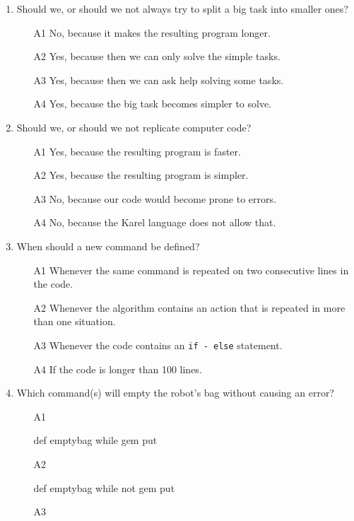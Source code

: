 \begin{enumerate}
\item Should we, or should we not always try to split a big task into smaller ones?
\begin{enumerate}
\item[A1] No, because it makes the resulting program longer.
\item[A2] Yes, because then we can only solve the simple tasks.
\item[A3] Yes, because then we can ask help solving some tasks.
\item[A4] Yes, because the big task becomes simpler to solve.
\end{enumerate}
\item Should we, or should we not replicate computer code?
\begin{enumerate}
\item[A1] Yes, because the resulting program is faster.
\item[A2] Yes, because the resulting program is simpler.
\item[A3] No, because our code would become prone to errors.
\item[A4] No, because the Karel language does not allow that.
\end{enumerate}
\item When should a new command be defined?
\begin{enumerate}
\item[A1] Whenever the same command is repeated on two consecutive lines in the code.
\item[A2] Whenever the algorithm contains an action that is repeated in
          more than one situation.
\item[A3] Whenever the code contains an {\tt if - else} statement.
\item[A4] If the code is longer than 100 lines.
\end{enumerate}
\item Which command(s) will empty the robot's bag without causing an error?
\begin{enumerate}
\item[A1] 
\begin{bluecode}
def emptybag
    while gem
        put
\end{bluecode}
\item[A2] 
\begin{bluecode}
def emptybag
    while not gem
        put
\end{bluecode}
\item[A3] 

\end{enumerate}
\end{enumerate}
